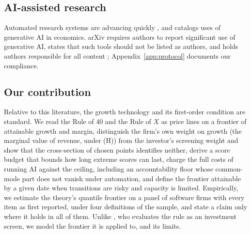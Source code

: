 \subsection{AI-assisted research}

Automated research systems are advancing quickly \citep{lu2024ai,si2025can,gottweis2026accelerating}, and \citet{korinek2023generative} catalogs uses of generative AI in economics. arXiv requires authors to report significant use of generative AI, states that such tools should not be listed as authors, and holds authors responsible for all content \citep{arxiv2026policy}; Appendix~\ref{app:protocol} documents our compliance.

\subsection{Our contribution}

Relative to this literature, the growth technology and its first-order condition are standard. We read the Rule of 40 and the Rule of $X$ as price lines on a frontier of attainable growth and margin, distinguish the firm's own weight on growth (the marginal value of revenue, under (H)) from the investor's screening weight and show that the cross-section of chosen points identifies neither, derive a score budget that bounds how long extreme scores can last, charge the full costs of running AI against the ceiling, including an accountability floor whose common-mode part does not vanish under automation, and define the frontier attainable by a given date when transitions are risky and capacity is limited. Empirically, we estimate the theory's quantile frontier on a panel of software firms with every item as first reported, under four definitions of the sample, and state a claim only where it holds in all of them. Unlike \citet{lee2024evaluating}, who evaluates the rule as an investment screen, we model the frontier it is applied to, and its limits.
